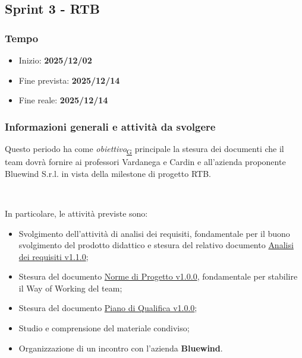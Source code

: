 \documentclass[a4paper,12pt]{article}
\begin{document}
    \subsection{Sprint 3 - RTB}{
        \subsubsection{Tempo}{
            \begin{itemize}
                \item[] Inizio: \textbf{2025/12/02} 
                \item[] Fine prevista: \textbf{2025/12/14} 
                \item[] Fine reale: \textbf{2025/12/14} 
            \end{itemize}
        }

        \subsubsection{Informazioni generali e attività da svolgere}{
            Questo periodo ha come \textit{obiettivo}\textsubscript{\href{https://atlasteam9.github.io/Atlas/glossario.html\#Obiettivo}{G}} principale la stesura dei documenti che il team dovrà fornire ai professori Vardanega e Cardin e all'azienda proponente Bluewind S.r.l. in vista della milestone di progetto RTB.
            
            \ 

            \noindent In particolare, le attività previste sono:
            \begin{itemize}
                \item Svolgimento dell'attività di analisi dei requisiti, fondamentale per il buono svolgimento del prodotto didattico e stesura del relativo documento \href{https://atlasteam9.github.io/Atlas/docs/RTB/documenti/esterni/Analisi%20dei%20Requisiti.pdf}{Analisi dei requisiti v1.1.0};
                \item Stesura del documento \href{https://atlasteam9.github.io/Atlas/docs/RTB/documenti/interni/Norme%20di%20Progetto.pdf}{Norme di Progetto v1.0.0}, fondamentale per stabilire il Way of Working del team;
                \item Stesura del documento \href{https://atlasteam9.github.io/Atlas/docs/RTB/documenti/esterni/Piano%20di%20Qualifica.pdf}{Piano di Qualifica v1.0.0};
                \item Studio e comprensione del materiale condiviso;
                \item Organizzazione di un incontro con l'azienda \textbf{Bluewind}.
            \end{itemize}
        }

}
\end{document}
